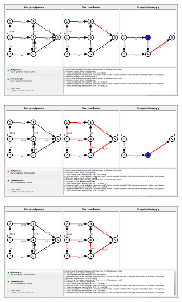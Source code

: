 \begin{appendices}
\begin{figure}
\begin{subfigure}{\textwidth}
 		\end{subfigure}\par\bigskip
 		\begin{subfigure}{\textwidth}
 			\includegraphics[width=0.9\linewidth]{./img/mkm08.jpg}
 		\end{subfigure}\par\bigskip
 		\begin{subfigure}{\textwidth}
 			\includegraphics[width=0.9\linewidth]{./img/mkm10.jpg}
 		\end{subfigure}
 	\end{figure}
 	\begin{figure}
 		\ContinuedFloat
 		\begin{subfigure}{\textwidth}
 			\includegraphics[width=0.9\linewidth]{./img/mkm11.jpg}

\end{subfigure}
\end{figure}
\end{appendices}
